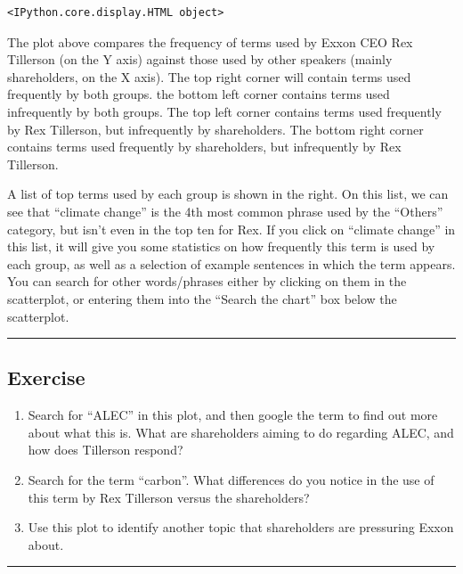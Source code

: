 \documentclass[
  letterpaper,
  DIV=11,
  numbers=noendperiod]{scrreprt}
\begin{document}
\begin{verbatim}
<IPython.core.display.HTML object>
\end{verbatim}

The plot above compares the frequency of terms used by Exxon CEO Rex
Tillerson (on the Y axis) against those used by other speakers (mainly
shareholders, on the X axis). The top right corner will contain terms
used frequently by both groups. the bottom left corner contains terms
used infrequently by both groups. The top left corner contains terms
used frequently by Rex Tillerson, but infrequently by shareholders. The
bottom right corner contains terms used frequently by shareholders, but
infrequently by Rex Tillerson.

A list of top terms used by each group is shown in the right. On this
list, we can see that ``climate change'' is the 4th most common phrase
used by the ``Others'' category, but isn't even in the top ten for Rex.
If you click on ``climate change'' in this list, it will give you some
statistics on how frequently this term is used by each group, as well as
a selection of example sentences in which the term appears. You can
search for other words/phrases either by clicking on them in the
scatterplot, or entering them into the ``Search the chart'' box below
the scatterplot.

\begin{center}\rule{0.5\linewidth}{0.5pt}\end{center}

\hypertarget{exercise-11}{%
\subsection{Exercise}\label{exercise-11}}

\begin{enumerate}
\def\labelenumi{\arabic{enumi}.}
\item
  Search for ``ALEC'' in this plot, and then google the term to find out
  more about what this is. What are shareholders aiming to do regarding
  ALEC, and how does Tillerson respond?
\item
  Search for the term ``carbon''. What differences do you notice in the
  use of this term by Rex Tillerson versus the shareholders?
\item
  Use this plot to identify another topic that shareholders are
  pressuring Exxon about.
\end{enumerate}

\begin{center}\rule{0.5\linewidth}{0.5pt}\end{center}
\end{document}
